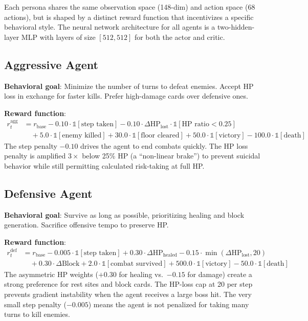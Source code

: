 Each persona shares the same observation space (148-dim) and action space (68 actions), but is shaped by a distinct reward function that incentivizes a specific behavioral style. The neural network architecture for all agents is a two-hidden-layer MLP with layers of size $[512, 512]$ for both the actor and critic.

\subsection{Aggressive Agent}

\textbf{Behavioral goal}: Minimize the number of turns to defeat enemies. Accept HP loss in exchange for faster kills. Prefer high-damage cards over defensive ones.

\textbf{Reward function}:
\begin{align}
r_t^{\text{agg}} &= r_{\text{base}} - 0.10 \cdot \mathbb{1}[\text{step taken}] - 0.10 \cdot \Delta\text{HP}_{\text{lost}} \cdot \mathbb{1}[\text{HP ratio} < 0.25] \nonumber \\
&\quad + 5.0 \cdot \mathbb{1}[\text{enemy killed}] + 30.0 \cdot \mathbb{1}[\text{floor cleared}] + 50.0 \cdot \mathbb{1}[\text{victory}] - 100.0 \cdot \mathbb{1}[\text{death}]
\end{align}
The step penalty $-0.10$ drives the agent to end combats quickly. The HP loss penalty is amplified $3\times$ below 25\% HP (a ``non-linear brake'') to prevent suicidal behavior while still permitting calculated risk-taking at full HP.

\subsection{Defensive Agent}

\textbf{Behavioral goal}: Survive as long as possible, prioritizing healing and block generation. Sacrifice offensive tempo to preserve HP.

\textbf{Reward function}:
\begin{align}
r_t^{\text{def}} &= r_{\text{base}} - 0.005 \cdot \mathbb{1}[\text{step taken}] + 0.30 \cdot \Delta\text{HP}_{\text{healed}} - 0.15 \cdot \min(\Delta\text{HP}_{\text{lost}}, 20) \nonumber \\
&\quad + 0.30 \cdot \Delta\text{Block} + 2.0 \cdot \mathbb{1}[\text{combat survived}] + 500.0 \cdot \mathbb{1}[\text{victory}] - 50.0 \cdot \mathbb{1}[\text{death}]
\end{align}
The asymmetric HP weights ($+0.30$ for healing vs.\ $-0.15$ for damage) create a strong preference for rest sites and block cards. The HP-loss cap at 20 per step prevents gradient instability when the agent receives a large boss hit. The very small step penalty ($-0.005$) means the agent is not penalized for taking many turns to kill enemies.

